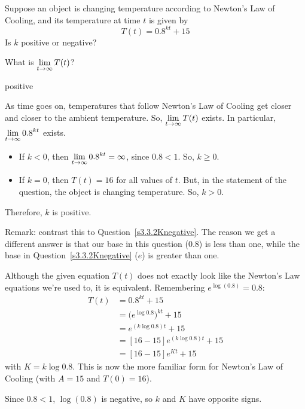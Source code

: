 


\begin{Mquestion}\label{s3.3.2Knegative2}
Suppose an object is changing temperature according to Newton's Law of Cooling, and its temperature at time $t$ is given by
\[T(t)=0.8^{kt}+15\]
Is $k$ positive or negative?
\end{Mquestion}
\begin{hint}
What is $\displaystyle\lim_{t \to \infty}T(t)$?
\end{hint}
\begin{answer}
positive
\end{answer}
\begin{solution}
As time goes on, temperatures that follow Newton's Law of Cooling get closer and closer to the ambient temperature. So, $\displaystyle\lim_{t \to \infty} T(t)$ exists. In particular,
$\displaystyle\lim_{t \to \infty} 0.8^{kt}$ exists.
\begin{itemize}
\item If $k<0$, then $\displaystyle\lim_{t \to \infty}0.8^{kt} = \infty$, since $0.8<1$. So, $k \geq 0$.
\item If $k=0$, then $T(t)=16$ for all values of $t$. But, in the statement of the question, the object is changing temperature. So, $k>0$.
\end{itemize}
Therefore, $k$ is positive.

Remark: contrast this to Question~\ref{s3.3.2Knegative}. The reason we get a different answer is that our base in this question (0.8) is less than one, while the base in
Question~\ref{s3.3.2Knegative} ($e$) is greater than one.

Although the given equation $T(t)$ does not exactly look like the Newton's Law equations we're used to, it is equivalent.
Remembering
$e^{\log(0.8)}=0.8$:
\begin{align*}
            T(t) &= 0.8^{kt} + 15 \\
                 &= \big(e^{\log 0.8}\big)^{kt} + 15 \\
                 &= e^{(k\log 0.8)t} + 15 \\
                 &= [16-15]  e^{(k\log 0.8)t} + 15 \\
                 &= [16-15]  e^{Kt} + 15
       \end{align*}
       with $K=k\log 0.8$. This is now the more familiar form for Newton's Law of Cooling (with $A=15$ and $T(0)=16$).

 Since $0.8<1$, $\log(0.8)$ is negative, so $k$ and $K$ have opposite signs.
\end{solution}
